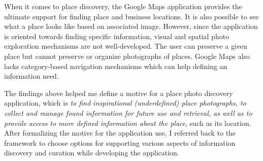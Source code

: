 {When it comes to place discovery, the Google Maps application provides the ultimate support for finding place and business locations. It is also possible to see what a place looks like based on associated image. However, since the application is oriented towards finding specific information, visual and spatial photo exploration mechanisms are not well-developed. The user can preserve a given place but cannot preserve or organize photographs of places. Google Maps also lacks category-based navigation mechanisms which can help defining an information need.  

The findings above helped me define a motive for a place photo discovery application, which is \textit{to find inspirational (underdefined) place photographs, to collect and manage found information for future use and retrieval, as well as to provide access to more defined information about the place}, such as its location. After formalizing the motive for the application use, I referred back to the framework to choose options for supporting various aspects of information discovery and curation while developing the application.
}

